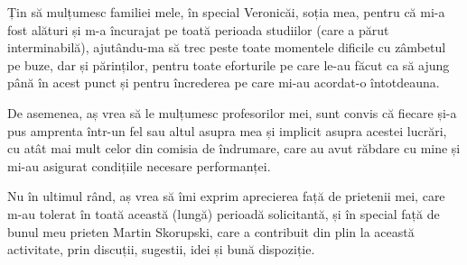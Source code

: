 Țin să mulțumesc familiei mele, în special Veronicăi, soția mea, pentru că mi-a fost alături și m-a încurajat pe toată perioada studiilor (care a părut interminabilă), ajutându-ma să trec peste toate momentele dificile cu zâmbetul pe buze, dar și părinților, pentru toate eforturile pe care le-au făcut ca să ajung până în acest punct și pentru încrederea pe care mi-au acordat-o întotdeauna.

De asemenea, aș vrea să le mulțumesc profesorilor mei, sunt convis că fiecare și-a pus amprenta într-un fel sau altul asupra mea și implicit asupra acestei lucrări, cu atât mai mult celor din comisia de îndrumare, care au avut răbdare cu mine și mi-au asigurat condițiile necesare performanței. 

Nu în ultimul rând, aș vrea să îmi exprim aprecierea față de prietenii mei, care m-au tolerat în toată această (lungă) perioadă solicitantă, și în special față de bunul meu prieten Martin Skorupski, care a contribuit din plin la această activitate, prin discuții, sugestii, idei și bună dispoziție.
